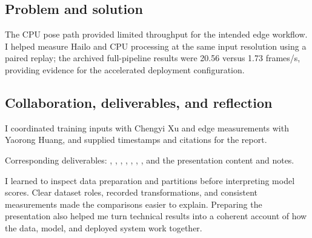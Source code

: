 \documentclass[conference,a4paper]{IEEEtran}
\newenvironment{evidence}{\par\smallskip\begingroup\footnotesize\raggedright\noindent}{\par\endgroup}
\begin{document}
\subsection{Problem and solution}

The CPU pose path provided limited throughput for the intended edge workflow. I helped measure Hailo and CPU processing at the same input resolution using a paired replay; the archived full-pipeline results were 20.56 versus 1.73 frames/s, providing evidence for the accelerated deployment configuration.

\subsection{Collaboration, deliverables, and reflection}

I coordinated training inputs with Chengyi Xu and edge measurements with Yaorong Huang, and supplied timestamps and citations for the report. \begin{evidence}
Corresponding deliverables: , , , , , , , and the presentation content and notes.
\end{evidence}

I learned to inspect data preparation and partitions before interpreting model scores. Clear dataset roles, recorded transformations, and consistent measurements made the comparisons easier to explain. Preparing the presentation also helped me turn technical results into a coherent account of how the data, model, and deployed system work together.
\end{document}
